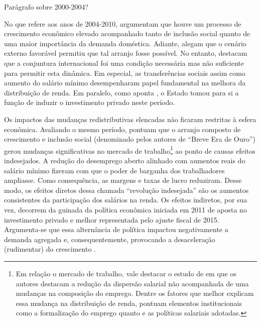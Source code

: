 {\color{blue} Parágrafo sobre 2000-2004?}


No que refere aos anos de 2004-2010, \textcite{correa_notas_2013} argumentam que houve um processo de crescimento econômico elevado acompanhado tanto de inclusão social quanto de uma maior importância da demanda doméstica. Adiante, alegam que o cenário externo favorável permitiu que tal arranjo fosse possível. No entanto, destacam que a conjuntura internacional foi uma condição necessária mas não suficiente para permitir esta dinâmica. Em especial, as transferências sociais assim como aumento do salário mínimo desempenharam papel fundamental na melhora da distribuição de renda. Em paralelo, como aponta \textcite{dos_santos_notas_2013}, o Estado tomou para si a função de induzir o investimento privado neste período.

Os impactos das mudanças redistributivas elencadas não ficaram restritas à esfera econômica. Avaliando o mesmo período, \textcite{serrano_conflito_2018} pontuam que o arranjo composto de crescimento e inclusão social (denominado pelos autores de ``Breve Era de Ouro'') gerou mudanças significativas no mercado de trabalho\footnote{Em relação o mercado de trabalho, vale destacar o estudo de \textcite{carneiro_politica_2018-1} em que os autores destacam a redução da dispersão salarial não acompanhada de uma mudanças na composição do emprego. Dentre os fatores que melhor explicam essa mudança na distribuição de renda, pontuam elementos institucionais como a formalização do emprego quanto e as políticas salariais adotadas.} ao ponto de causas efeitos indesejados. A redução do desemprego aberto alinhado com aumentos reais do salário mínimo fizeram com que o poder de barganha dos trabalhadores ampliasse. Como consequência, as margens e taxas de lucro reduziram. Desse modo, os efeitos diretos dessa chamada ``revolução indesejada'' são os aumentos consistentes da participação dos salários na renda. Os efeitos indiretos, por sua vez, decorrem da guinada da política econômica iniciada em 2011 de aposta no investimento privado e melhor representada pelo ajuste fiscal de 2015. Argumenta-se que essa alternância de política impactou negativamente a demanda agregada e, consequentemente, provocando a desaceleração (rudimentar) do crescimento \cite{serrano_demanda_2015}.

